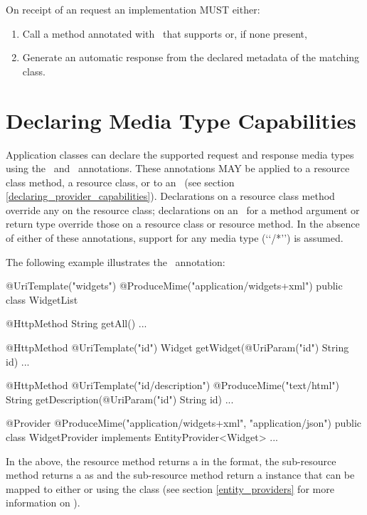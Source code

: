 On receipt of an  request an implementation MUST either:

\begin{enumerate}
\item Call a method annotated with \HttpMethod\ that supports  or, if none present,
\item Generate an automatic response from the declared metadata of the matching class.
\end{enumerate}


\section{Declaring Media Type Capabilities}
\label{declaring_method_capabilities}

Application classes can declare the supported request and response media types using the \ProduceMime\ and \ConsumeMime\ annotations. These annotations MAY be applied to a resource class method, a resource class, or to an \EntityProvider\ (see section \ref{declaring_provider_capabilities}). Declarations on a resource class method override any on the resource class; declarations on an \EntityProvider\ for a method argument or return type override those on a resource class or resource method. In the absence of either of these annotations, support for any media type (\lq\lq*/*\rq\rq) is assumed.

The following example illustrates the \ProduceMime\ annotation:

\begin{listing}{1}
@UriTemplate("widgets")
@ProduceMime("application/widgets+xml")
public class WidgetList {
  
  @HttpMethod
  String getAll() {...}
  
  @HttpMethod
  @UriTemplate("{id}")
  Widget getWidget(@UriParam("id") String id) {...}

  @HttpMethod
  @UriTemplate("{id}/description")
  @ProduceMime("text/html")
  String getDescription(@UriParam("id") String id) {...}
}

@Provider
@ProduceMime({"application/widgets+xml", "application/json"})
public class WidgetProvider implements EntityProvider<Widget> {...}
\end{listing}

In the above, the  resource method returns a  in the  format, the  sub-resource method returns a  as  and the  sub-resource method return a  instance that can be mapped to either  or  using the  class (see section \ref{entity_providers} for more information on \EntityProvider).

